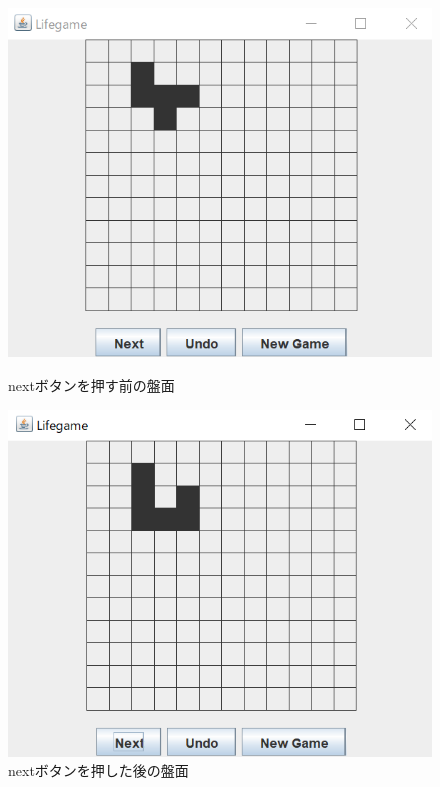 \documentclass[dvipdfmx]{jarticle}
\begin{document}
\begin{figure}[htbp]
  \begin{minipage}[b]{0.45\linewidth}
    \centering
    \includegraphics[keepaspectratio, scale=0.35]{before_next.png}
    \caption{nextボタンを押す前の盤面}
  \end{minipage}
  \begin{minipage}[b]{0.45\linewidth}
    \centering
    \includegraphics[keepaspectratio, scale=0.35]{after_next.png}
    \caption{nextボタンを押した後の盤面}
  \end{minipage}
\end{figure}
\end{document}
